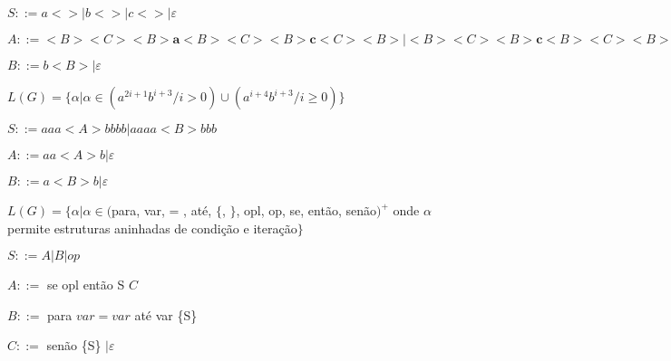 \documentclass[ ]{article}
\begin{document}
%	
%	
	
	$S::= a<> | b<> | c<> | \varepsilon$
	
	$A::=<B><C><B>\textbf{a}<B><C><B>\textbf{c}<C><B> | <B><C><B>\textbf{c}<B><C><B>\textbf{a}<B><C><B> | \varepsilon | <B>$
	
	$B::= b<B> | \varepsilon$
	
	$L(G) = \{ \alpha | \alpha \in (a^{2i+1}b^{i+3} / i>0) \cup (a^{i+4}b^{i+3}/i\geq 0)\}$
	
	$S::= aaa<A>bbbb | aaaa<B>bbb$ %
	
	$A::= aa<A>b | \varepsilon$ %
	
	$B::= a<B>b | \varepsilon$ %
	
	$L(G) = \{ \alpha | \alpha \in ($para, var, = , até, $\{$, $\}$, opl, op, se, então, senão$)^+$ onde $\alpha$ permite estruturas aninhadas de condição e iteração$\}$ %
	
	$S::= A | B | op$
	
	$A::=$ se opl então {S} $C$
	
	$B::=$ para  $var = var$ até var \{S\}
	
	$C::=$ senão \{S\}  $| \varepsilon$
%
%
%


	
	
	\newpage

%
%	
%	
%	
%	
%	
%	
%	
%	
%	
%
%
%	
%	
%	
%	
\end{document}

